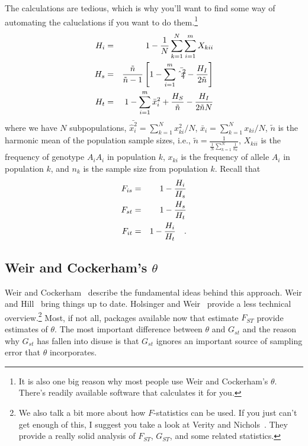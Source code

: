 \documentclass[12pt]{article}
\begin{document}
The calculations are tedious, which is why you'll want to find some
way of automating the caluclations if you want to do them.\footnote{It
  is also one big reason why most people use Weir and Cockerham's
  $\theta$. There's readily available software that calculates it for
  you.}
\begin{eqnarray*}
H_{i} &=& 1 - {1 \over N} \sum_{k=1}^{N} \sum_{i=1}^{m} {X_{kii}} \\
H_{s} &=& {\tilde n \over {\tilde n - 1}}
         \left[1 - \sum_{i=1}^{m} {\bar {\hat x_{i}^{2}}}
         - {H_{I} \over {2 \tilde n}}\right] \\
H_{t} &=& 1 - \sum_{i=1}^{m} {\bar x_{i}^{2}} + {H_{S} \over {\tilde n}}
         - {H_{I} \over {2 \tilde n N}}
\end{eqnarray*}
where we have $N$ subpopulations,
${\bar {\hat x_{i}^{2}}} = \sum_{k=1}^{N} {x_{ki}^{2}}/N$,
${\bar x_{i}} = \sum_{k=1}^{N} x_{ki}/N$, $\tilde n$
is the harmonic mean of the population sample sizes, i.e.,
$ \tilde n = \frac{1}{\frac{1}{N} \sum_{k=1}^{N} \frac{1}{n_k}}$,
$X_{kii}$ is the frequency of genotype $A_{i}A_{i}$ in population $k$,
$x_{ki}$ is the frequency of allele $A_{i}$ in population $k$, and $n_k$ is
the sample size from population $k$.  Recall that
\begin{eqnarray*}
F_{is} &=& 1 - {H_{i} \over H_{s}} \\
F_{st} &=& 1 - {H_{s} \over H_{t}} \\
F_{it} &=& 1 - {H_{i} \over H_{t}} \quad .
\end{eqnarray*}

\subsection*{Weir and Cockerham's $\theta$}

Weir and Cockerham~\cite{WeirCockerham84} describe the fundamental
ideas behind this approach. Weir and Hill~\cite{Weir-Hill-2002} bring
things up to date. Holsinger and Weir~\cite{Holsinger-Weir-2009}
provide a less technical overview.\footnote{We also talk a bit more
  about how $F$-statistics can be used. If you just can't get enough
  of this, I suggest you take a look at Verity and
  Nichols~\cite{Verity-Nichols-2014}. They provide a really solid
  analysis of $F_{ST}$, $G_{ST}$, and some related statistics.} Most,
if not all, packages available now that estimate $F_{ST}$ provide
estimates of $\theta$. The most important difference between $\theta$
and $G_{st}$ and the reason why $G_{st}$ has fallen into disuse is
that $G_{st}$ ignores an important source of sampling error that
$\theta$ incorporates.
\end{document}
